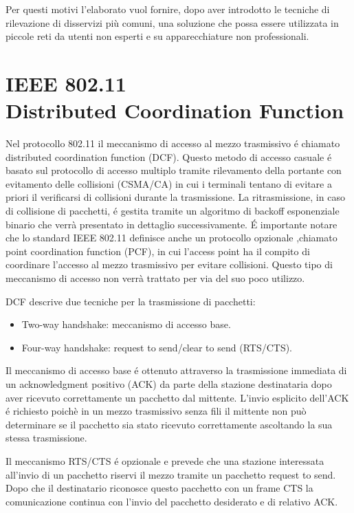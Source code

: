 Per questi motivi l'elaborato vuol fornire, dopo aver introdotto le tecniche di rilevazione di disservizi pi\`u comuni, una soluzione che possa essere utilizzata in piccole reti da utenti non esperti e su apparecchiature non professionali.

\section[IEEE 802.11 Distributed Coordination Function]{IEEE 802.11 \\Distributed Coordination Function}
Nel protocollo 802.11 il meccanismo di accesso al mezzo trasmissivo \'e chiamato distributed coordination function (DCF).
Questo metodo di accesso casuale \'e basato sul protocollo di accesso multiplo tramite rilevamento della portante con evitamento delle collisioni (CSMA/CA) in cui i terminali tentano di evitare a priori il verificarsi di collisioni durante la trasmissione.
La ritrasmissione, in caso di collisione di pacchetti, \'e gestita tramite un algoritmo di backoff esponenziale binario che verr\`a presentato in dettaglio successivamente.
\'E importante notare che lo standard IEEE 802.11 definisce anche un  protocollo opzionale ,chiamato point coordination function (PCF), in cui l'access point ha il compito di coordinare l'accesso al mezzo trasmissivo per evitare collisioni. 
Questo tipo di meccanismo di accesso non verr\`a trattato per via del suo poco utilizzo.

DCF descrive due tecniche per la trasmissione di pacchetti:
\begin{itemize}
 \item Two-way handshake: meccanismo di accesso base.
 \item Four-way handshake: request to send/clear to send (RTS/CTS).
\end{itemize}

Il meccanismo di accesso base \'e ottenuto attraverso la trasmissione immediata di un acknowledgment positivo (ACK) da parte della stazione destinataria dopo aver ricevuto correttamente un pacchetto dal mittente.
L'invio esplicito dell'ACK \'e richiesto poich\`e in un mezzo trasmissivo senza fili il mittente non pu\`o determinare se il pacchetto sia stato ricevuto correttamente ascoltando la sua stessa trasmissione.

Il meccanismo RTS/CTS \'e opzionale e prevede che una stazione interessata all'invio di un pacchetto riservi il mezzo tramite un pacchetto request to send.
Dopo che il destinatario riconosce questo pacchetto con un frame CTS la comunicazione continua con l'invio del pacchetto desiderato e di relativo ACK.

